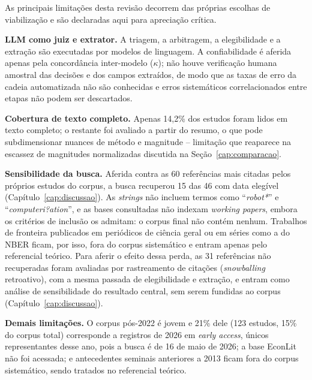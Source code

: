 
As principais limitações desta revisão decorrem das próprias escolhas de viabilização e são declaradas aqui para apreciação crítica.

\textbf{LLM como juiz e extrator.} A triagem, a arbitragem, a elegibilidade e a extração são executadas por modelos de linguagem. A confiabilidade é aferida apenas pela concordância inter-modelo ($\kappa$); não houve verificação humana amostral das decisões e dos campos extraídos, de modo que as taxas de erro da cadeia automatizada não são conhecidas e erros sistemáticos correlacionados entre etapas não podem ser descartados.

\textbf{Cobertura de texto completo.} Apenas 14,2\% dos estudos foram lidos em texto completo; o restante foi avaliado a partir do resumo, o que pode subdimensionar nuances de método e magnitude -- limitação que reaparece na escassez de magnitudes normalizadas discutida na Seção~\ref{cap:comparacao}.

\textbf{Sensibilidade da busca.} Aferida contra as 60 referências mais citadas pelos próprios estudos do corpus, a busca recuperou 15 das 46 com data elegível (Capítulo~\ref{cap:discussao}). As \textit{strings} não incluem termos como ``\textit{robot*}'' e ``\textit{computeri?ation}'', e as bases consultadas não indexam \textit{working papers}, embora os critérios de inclusão os admitam: o corpus final não contém nenhum. Trabalhos de fronteira publicados em periódicos de ciência geral ou em séries como a do NBER ficam, por isso, fora do corpus sistemático e entram apenas pelo referencial teórico. Para aferir o efeito dessa perda, as 31 referências não recuperadas foram avaliadas por rastreamento de citações (\textit{snowballing} retroativo), com a mesma passada de elegibilidade e extração, e entram como análise de sensibilidade do resultado central, sem serem fundidas ao corpus (Capítulo~\ref{cap:discussao}).

\textbf{Demais limitações.} O corpus pós-2022 é jovem e 21\% dele (123 estudos, 15\% do corpus total) corresponde a registros de 2026 em \textit{early access}, únicos representantes desse ano, pois a busca é de 16 de maio de 2026; a base EconLit não foi acessada; e antecedentes seminais anteriores a 2013 ficam fora do corpus sistemático, sendo tratados no referencial teórico.
